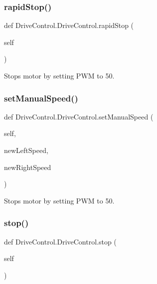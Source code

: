 \subsubsection{\texorpdfstring{rapid\+Stop()}{rapidStop()}}
{\footnotesize\ttfamily def Drive\+Control.\+Drive\+Control.\+rapid\+Stop (\begin{DoxyParamCaption}\item[{}]{self }\end{DoxyParamCaption})}



Stops motor by setting P\+WM to 50. 

\mbox{\label{classDriveControl_1_1DriveControl_a3077cc4bce48f0c1996f6ac2f4c5b40c}} 
\subsubsection{\texorpdfstring{set\+Manual\+Speed()}{setManualSpeed()}}
{\footnotesize\ttfamily def Drive\+Control.\+Drive\+Control.\+set\+Manual\+Speed (\begin{DoxyParamCaption}\item[{}]{self,  }\item[{}]{new\+Left\+Speed,  }\item[{}]{new\+Right\+Speed }\end{DoxyParamCaption})}



Stops motor by setting P\+WM to 50. 

\mbox{\label{classDriveControl_1_1DriveControl_a51225e6485e533a32f7fbf1a020e4d38}} 
\subsubsection{\texorpdfstring{stop()}{stop()}}
{\footnotesize\ttfamily def Drive\+Control.\+Drive\+Control.\+stop (\begin{DoxyParamCaption}\item[{}]{self }\end{DoxyParamCaption})}



